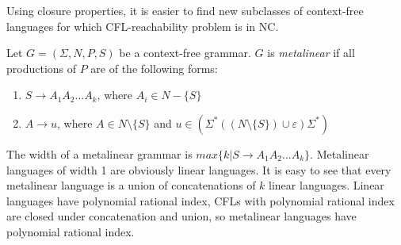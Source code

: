 Using closure properties, it is easier to find new subclasses of context-free languages for which CFL-reachability problem is in NC.
\begin{example}
Let $G = (\Sigma, N, P, S)$ be a context-free grammar. $G$ is \textit{metalinear} if all productions of $P$ are of the following forms:
\begin{enumerate}
\item $S \rightarrow A_1A_2...A_k$, where $A_i \in N - \{S\}$
\item $A \rightarrow u$, where $A \in N \setminus \{S\}$ and $u \in (\Sigma^*((N \setminus \{S\}) \cup {\varepsilon})\Sigma^*)$
\end{enumerate}


The width of a metalinear grammar is $max\{k\vert S \rightarrow A_1A_2...A_k \}$. Metalinear languages of width 1 are obviously linear languages. It is easy to see that every metalinear language is a union of concatenations of $k$ linear languages. Linear languages have polynomial rational index,  CFLs with polynomial rational index are closed under concatenation and union, so metalinear languages have polynomial rational index.
\end{example}

